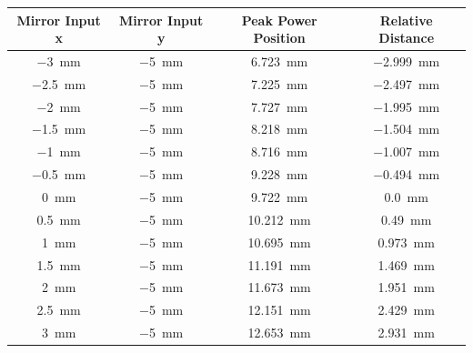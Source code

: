 \begin{table}[ht]
    \centering
    \begin{tabular}{| c | c | c | c |} %
        \hline Mirror Input x & Mirror Input y & Peak Power Position & Relative Distance \\ \hline %
        \SI{-3}{mm}           & \SI{-5}{mm}    & \SI{6.723}{mm}      & \SI{-2.999}{mm}   \\
        \SI{-2.5}{mm}         & \SI{-5}{mm}    & \SI{7.225}{mm}      & \SI{-2.497}{mm}   \\
        \SI{-2}{mm}           & \SI{-5}{mm}    & \SI{7.727}{mm}      & \SI{-1.995}{mm}   \\
        \SI{-1.5}{mm}         & \SI{-5}{mm}    & \SI{8.218}{mm}      & \SI{-1.504}{mm}   \\
        \SI{-1}{mm}           & \SI{-5}{mm}    & \SI{8.716}{mm}      & \SI{-1.007}{mm}   \\
        \SI{-0.5}{mm}         & \SI{-5}{mm}    & \SI{9.228}{mm}      & \SI{-0.494}{mm}   \\
        \SI{0}{mm}            & \SI{-5}{mm}    & \SI{9.722}{mm}      & \SI{0.0}{mm}      \\
        \SI{0.5}{mm}          & \SI{-5}{mm}    & \SI{10.212}{mm}     & \SI{0.49}{mm}     \\
        \SI{1}{mm}            & \SI{-5}{mm}    & \SI{10.695}{mm}     & \SI{0.973}{mm}    \\
        \SI{1.5}{mm}          & \SI{-5}{mm}    & \SI{11.191}{mm}     & \SI{1.469}{mm}    \\
        \SI{2}{mm}            & \SI{-5}{mm}    & \SI{11.673}{mm}     & \SI{1.951}{mm}    \\
        \SI{2.5}{mm}          & \SI{-5}{mm}    & \SI{12.151}{mm}     & \SI{2.429}{mm}    \\
        \SI{3}{mm}            & \SI{-5}{mm}    & \SI{12.653}{mm}     & \SI{2.931}{mm}    \\

        \hline



\end{tabular}
\end{table}
